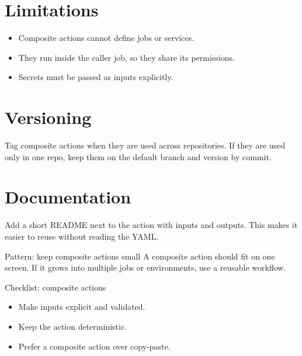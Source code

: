 \section{Limitations}
\begin{itemize}[nosep]
  \item Composite actions cannot define jobs or services.
  \item They run inside the caller job, so they share its permissions.
  \item Secrets must be passed as inputs explicitly.
\end{itemize}

\section{Versioning}
Tag composite actions when they are used across repositories.
If they are used only in one repo, keep them on the default branch and version by commit.

\section{Documentation}
Add a short README next to the action with inputs and outputs.
This makes it easier to reuse without reading the YAML.

\begin{patternbox}{Pattern: keep composite actions small}
A composite action should fit on one screen.
If it grows into multiple jobs or environments, use a reusable workflow.
\end{patternbox}

\begin{checklistbox}{Checklist: composite actions}
\begin{itemize}[nosep]
  \item Make inputs explicit and validated.
  \item Keep the action deterministic.
  \item Prefer a composite action over copy-paste.
\end{itemize}
\end{checklistbox}
